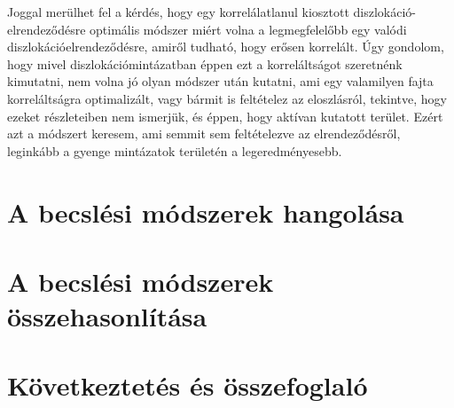 \documentclass[10pt,a4paper]{scrartcl}
\begin{document}
Joggal merülhet fel a kérdés, hogy egy korrelálatlanul kiosztott diszlokáció-elrendeződésre optimális módszer miért volna a legmegfelelőbb egy valódi diszlokációelrendeződésre, amiről tudható, hogy erősen korrelált. Úgy gondolom, hogy mivel diszlokációmintázatban éppen ezt a korreláltságot szeretnénk kimutatni, nem volna jó olyan módszer után kutatni, ami egy valamilyen fajta korreláltságra optimalizált, vagy bármit is feltételez az eloszlásról, tekintve, hogy ezeket részleteiben nem ismerjük, és éppen, hogy aktívan kutatott terület. Ezért azt a módszert keresem, ami semmit sem feltételezve az elrendeződésről, leginkább a gyenge mintázatok területén a legeredményesebb.

\section{A becslési módszerek hangolása}

\section{A becslési módszerek összehasonlítása}

\section{Következtetés és összefoglaló}
\end{document}
